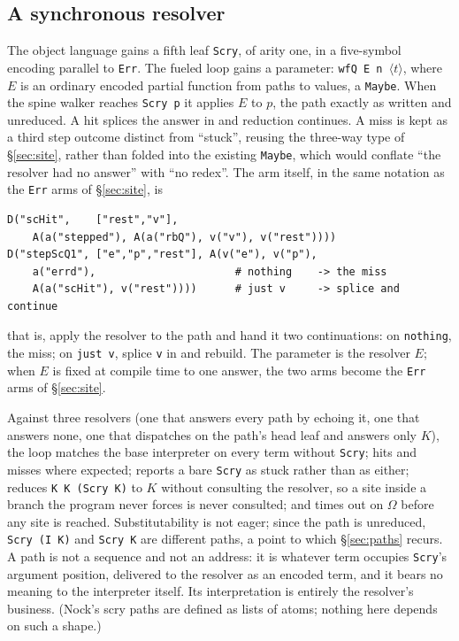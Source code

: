 \documentclass[review]{jfp-epi}
\begin{document}
\subsection{A synchronous resolver}\label{sec:sync}

The object language gains a fifth leaf \texttt{Scry}, of arity one,
in a five-symbol encoding parallel to \texttt{Err}. The fueled loop
gains a parameter: \texttt{wfQ E n $\langle t\rangle$}, where
$E$ is an ordinary encoded partial function from paths to values, a
\texttt{Maybe}. When the spine walker reaches \texttt{Scry p} it applies
$E$ to $p$, the path exactly as written and unreduced. A hit splices the
answer in and reduction continues. A miss is kept as a third step outcome
distinct from ``stuck'', reusing the three-way type of
\S\ref{sec:site}, rather than folded into the existing \texttt{Maybe},
which would conflate ``the resolver had no answer'' with ``no redex''.
The arm itself, in the same notation as the \texttt{Err} arms of
\S\ref{sec:site}, is
\begin{verbatim}
D("scHit",    ["rest","v"],
    A(a("stepped"), A(a("rbQ"), v("v"), v("rest"))))
D("stepScQ1", ["e","p","rest"], A(v("e"), v("p"),
    a("errd"),                      # nothing    -> the miss
    A(a("scHit"), v("rest"))))      # just v     -> splice and continue
\end{verbatim}
that is, apply the resolver to the path and hand it two continuations:
on \texttt{nothing}, the miss; on \texttt{just v}, splice \texttt{v} in
and rebuild. The parameter is the resolver $E$; when $E$ is fixed at
compile time to one answer, the two arms become the \texttt{Err} arms of
\S\ref{sec:site}.

Against three resolvers (one that answers every path by echoing it,
one that answers none, one that dispatches on the path's head leaf and
answers only $K$), the loop matches the base interpreter on every term
without \texttt{Scry}; hits and misses where expected; reports a
bare \texttt{Scry} as stuck rather than as either; reduces
\texttt{K K (Scry K)} to $K$ without consulting the resolver, so a site
inside a branch the program never forces is never consulted; and times
out on $\Omega$ before any site is reached. Substitutability is not
eager; since the path is unreduced, \texttt{Scry (I K)} and
\texttt{Scry K} are different paths, a point to which \S\ref{sec:paths}
recurs. A path is not a sequence and not an address: it is whatever
term occupies \texttt{Scry}'s argument position, delivered to the
resolver as an encoded term, and it bears no meaning to the interpreter
itself. Its interpretation is entirely the resolver's business. (Nock's
scry paths are defined as lists of atoms; nothing here depends on such
a shape.)
\end{document}

